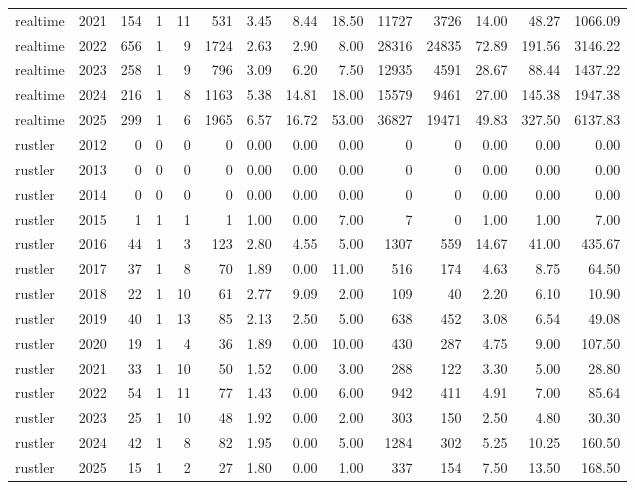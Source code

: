 \begin{table}[htbp]
\begin{tabular}{lrrrrrrrrrrrrr}
realtime & 2021 & 154 & 1 & 11 & 531 & 3.45 & 8.44 & 18.50 & 11727 & 3726 & 14.00 & 48.27 & 1066.09 \\
realtime & 2022 & 656 & 1 & 9 & 1724 & 2.63 & 2.90 & 8.00 & 28316 & 24835 & 72.89 & 191.56 & 3146.22 \\
realtime & 2023 & 258 & 1 & 9 & 796 & 3.09 & 6.20 & 7.50 & 12935 & 4591 & 28.67 & 88.44 & 1437.22 \\
realtime & 2024 & 216 & 1 & 8 & 1163 & 5.38 & 14.81 & 18.00 & 15579 & 9461 & 27.00 & 145.38 & 1947.38 \\
realtime & 2025 & 299 & 1 & 6 & 1965 & 6.57 & 16.72 & 53.00 & 36827 & 19471 & 49.83 & 327.50 & 6137.83 \\
rustler & 2012 & 0 & 0 & 0 & 0 & 0.00 & 0.00 & 0.00 & 0 & 0 & 0.00 & 0.00 & 0.00 \\
rustler & 2013 & 0 & 0 & 0 & 0 & 0.00 & 0.00 & 0.00 & 0 & 0 & 0.00 & 0.00 & 0.00 \\
rustler & 2014 & 0 & 0 & 0 & 0 & 0.00 & 0.00 & 0.00 & 0 & 0 & 0.00 & 0.00 & 0.00 \\
rustler & 2015 & 1 & 1 & 1 & 1 & 1.00 & 0.00 & 7.00 & 7 & 0 & 1.00 & 1.00 & 7.00 \\
rustler & 2016 & 44 & 1 & 3 & 123 & 2.80 & 4.55 & 5.00 & 1307 & 559 & 14.67 & 41.00 & 435.67 \\
rustler & 2017 & 37 & 1 & 8 & 70 & 1.89 & 0.00 & 11.00 & 516 & 174 & 4.63 & 8.75 & 64.50 \\
rustler & 2018 & 22 & 1 & 10 & 61 & 2.77 & 9.09 & 2.00 & 109 & 40 & 2.20 & 6.10 & 10.90 \\
rustler & 2019 & 40 & 1 & 13 & 85 & 2.13 & 2.50 & 5.00 & 638 & 452 & 3.08 & 6.54 & 49.08 \\
rustler & 2020 & 19 & 1 & 4 & 36 & 1.89 & 0.00 & 10.00 & 430 & 287 & 4.75 & 9.00 & 107.50 \\
rustler & 2021 & 33 & 1 & 10 & 50 & 1.52 & 0.00 & 3.00 & 288 & 122 & 3.30 & 5.00 & 28.80 \\
rustler & 2022 & 54 & 1 & 11 & 77 & 1.43 & 0.00 & 6.00 & 942 & 411 & 4.91 & 7.00 & 85.64 \\
rustler & 2023 & 25 & 1 & 10 & 48 & 1.92 & 0.00 & 2.00 & 303 & 150 & 2.50 & 4.80 & 30.30 \\
rustler & 2024 & 42 & 1 & 8 & 82 & 1.95 & 0.00 & 5.00 & 1284 & 302 & 5.25 & 10.25 & 160.50 \\
rustler & 2025 & 15 & 1 & 2 & 27 & 1.80 & 0.00 & 1.00 & 337 & 154 & 7.50 & 13.50 & 168.50 \\
\bottomrule
\end{tabular}
\end{table}
